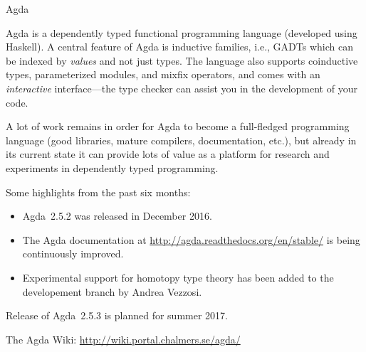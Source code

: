 \documentclass{article}
\begin{document}
\begin{hcarentry}{Agda}
\label{agda}
\makeheader

Agda is a dependently typed functional programming language (developed
using Haskell). A central feature of Agda is inductive families,
i.e., GADTs which can be indexed by \emph{values} and not just types.
The language also supports coinductive types, parameterized modules,
and mixfix operators, and comes with an \emph{interactive}
interface---the type checker can assist you in the development of your
code.

A lot of work remains in order for Agda to become a full-fledged
programming language (good libraries, mature compilers, documentation,
etc.), but already in its current state it can provide lots of value as a
platform for research and experiments in dependently typed programming.

Some highlights from the past six months:
\begin{itemize}
\item Agda~2.5.2 was released in December 2016.
\item The Agda documentation at
\url{http://agda.readthedocs.org/en/stable/} is being continuously improved.
\item Experimental support for homotopy type theory has been added to the
developement branch by Andrea Vezzosi.
\end{itemize}
Release of Agda~2.5.3 is planned for summer 2017.

\FurtherReading
  The Agda Wiki: \url{http://wiki.portal.chalmers.se/agda/}
\end{hcarentry}
\end{document}

